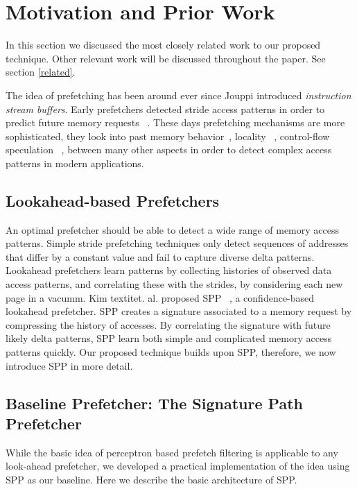 \section{Motivation and Prior Work}
\label{Background}

In this section we discussed the most closely related work to our proposed technique. Other relevant work will be discussed throughout the paper. See section \ref{related}.

	The idea of prefetching has been around ever since Jouppi introduced \textit{instruction stream buffers}. Early prefetchers detected stride access patterns in order to predict future memory requests ~\cite{Smith,Baer,Stride}. These days prefetching mechanisms are more sophisticated, they look into past memory behavior~\cite{Address_Correlated,AMPM}, locality ~\cite{Spatial_Pattern,SMS,Temporal_Instruction_Fetch,Off_Chip,STMS,SMS_JILP}, control-flow speculation ~\cite{BFetch,MTBFetch}, between many other aspects in order to detect complex access patterns in modern applications.

\subsection{Lookahead-based Prefetchers}

An optimal prefetcher should be able to detect a wide range of memory access patterns. Simple stride prefetching techniques only detect sequences of addresses that differ by a constant value and fail to capture diverse delta patterns. Lookahead prefetchers learn patterns by collecting histories of observed data access patterns, and correlating these with the strides, by considering each new page in a vacumm. Kim textit{et. al.} proposed SPP ~\cite{SPP}, a confidence-based lookahead prefetcher. SPP creates a signature associated to a memory request by compressing the history of accesses. By correlating the signature with future likely delta patterns, SPP learn both simple and complicated memory access patterns quickly. Our proposed technique builds upon SPP, therefore, we now introduce SPP in more detail.  


\subsection{Baseline Prefetcher: The Signature Path Prefetcher}
\label{Background-SPP}

While the basic idea of perceptron based prefetch filtering is applicable to
any look-ahead prefetcher, we developed a practical implementation of the idea
using SPP as our baseline.  Here we describe the basic architecture of SPP.

